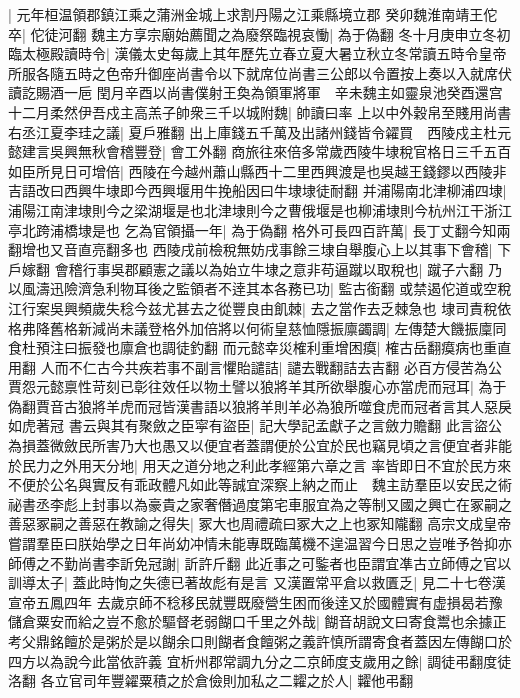 |{
	元年桓温領郡鎮江乘之蒲洲金城上求割丹陽之江乘縣境立郡}
癸卯魏淮南靖王佗卒|{
	佗徒河翻}
魏主方享宗廟始薦聞之為廢祭臨視哀慟|{
	為于偽翻}
冬十月庚申立冬初臨太極殿讀時令|{
	漢儀太史每歲上其年歷先立春立夏大暑立秋立冬常讀五時令皇帝所服各隨五時之色帝升御座尚書令以下就席位尚書三公郎以令置按上奏以入就席伏讀訖賜酒一巵}
閏月辛酉以尚書僕射王奐為領軍將軍　辛未魏主如靈泉池癸酉還宫十二月柔然伊吾戍主高羔子帥衆三千以城附魏|{
	帥讀曰率}
上以中外穀帛至賤用尚書右丞江夏李珪之議|{
	夏戶雅翻}
出上庫錢五千萬及出諸州錢皆令糴買　西陵戍主杜元懿建言吳興無秋會稽豐登|{
	會工外翻}
商旅往來倍多常歲西陵牛埭稅官格日三千五百如臣所見日可增倍|{
	西陵在今越州蕭山縣西十二里西興渡是也吳越王錢鏐以西陵非吉語改曰西興牛埭即今西興堰用牛挽船因曰牛埭埭徒耐翻}
并浦陽南北津柳浦四埭|{
	浦陽江南津埭則今之梁湖堰是也北津埭則今之曹俄堰是也柳浦埭則今杭州江干浙江亭北跨浦橋埭是也}
乞為官領攝一年|{
	為于偽翻}
格外可長四百許萬|{
	長丁丈翻今知兩翻增也又音直亮翻多也}
西陵戌前檢稅無妨戌事餘三埭自舉腹心上以其事下會稽|{
	下戶嫁翻}
會稽行事吳郡顧憲之議以為始立牛埭之意非苟逼蹴以取稅也|{
	蹴子六翻}
乃以風濤迅險濟急利物耳後之監領者不逹其本各務已功|{
	監古銜翻}
或禁遏佗道或空稅江行案吳興頻歲失稔今兹尤甚去之從豐良由飢棘|{
	去之當作去乏棘急也}
埭司責稅依格弗降舊格新減尚未議登格外加倍將以何術皇慈恤隱振廪蠲調|{
	左傳楚大饑振廩同食杜預注曰振發也廪倉也調徒釣翻}
而元懿幸災榷利重增困瘼|{
	榷古岳翻瘼病也重直用翻}
人而不仁古今共疾若事不副言懼貽譴詰|{
	譴去戰翻詰去吉翻}
必百方侵苦為公賈怨元懿禀性苛刻已彰往效任以物土譬以狼將羊其所欲舉腹心亦當虎而冠耳|{
	為于偽翻賈音古狼將羊虎而冠皆漢書語以狼將羊則羊必為狼所噬食虎而冠者言其人惡戾如虎著冠}
書云與其有聚斂之臣寜有盜臣|{
	記大學記孟獻子之言斂力贍翻}
此言盜公為損蓋微斂民所害乃大也愚又以便宜者蓋謂便於公宜於民也竊見頃之言便宜者非能於民力之外用天分地|{
	用天之道分地之利此孝經第六章之言}
率皆即日不宜於民方來不便於公名與實反有乖政體凡如此等誠宜深察上納之而止　魏主訪羣臣以安民之術祕書丞李彪上封事以為豪貴之家奢僭過度第宅車服宜為之等制又國之興亡在冢嗣之善惡冢嗣之善惡在教諭之得失|{
	冢大也周禮疏曰冢大之上也冢知隴翻}
高宗文成皇帝嘗謂羣臣曰朕始學之日年尚幼冲情未能專既臨萬機不遑温習今日思之豈唯予咎抑亦師傅之不勤尚書李訢免冠謝|{
	訢許斤翻}
此近事之可鍳者也臣謂宜凖古立師傅之官以訓導太子|{
	蓋此時恂之失德已著故彪有是言}
又漢置常平倉以救匱乏|{
	見二十七卷漢宣帝五鳳四年}
去歲京師不稔移民就豐既廢營生困而後逹又於國體實有虚損曷若豫儲倉粟安而給之豈不愈於驅督老弱餬口千里之外哉|{
	餬音胡說文曰寄食鬻也余據正考父鼎銘饘於是粥於是以餬余口則餬者食饘粥之義許慎所謂寄食者蓋因左傳餬口於四方以為說今此當依許義}
宜析州郡常調九分之二京師度支歲用之餘|{
	調徒弔翻度徒洛翻}
各立官司年豐糴粟積之於倉儉則加私之二糶之於人|{
	糶他弔翻}
